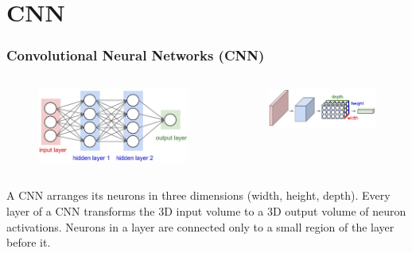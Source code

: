 \section{CNN}

\begin{frame}
	\frametitle{Convolutional Neural Networks (CNN)}

	\begin{columns}
      		\begin{figure}
             		\includegraphics[width=1\textwidth]{Pics/neural_net2}
                \end{figure}
                \begin{figure}
                        \includegraphics[width=1\textwidth]{Pics/cnn}
                \end{figure}

        \end{columns}

	\vskip 0.5cm

	A CNN arranges its neurons in three dimensions (width, height, depth). 
	Every layer of a CNN transforms the 3D input volume to a 3D output volume of neuron activations.
	Neurons in a layer are connected only to a small region of the layer before it.

\end{frame}


